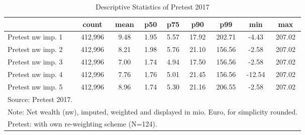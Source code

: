 \begin{table}[htbp]\centering
\def\sym#1{\ifmmode^{#1}\else\(^{#1}\)\fi}
\caption{Descriptive Statistics of Pretest 2017}
\begin{tabular}{l*{1}{cccccccc}}
\hline\hline
                                            &       count&        mean&         p50&         p75&         p90&         p99&         min&         max\\
\hline
Pretest nw imp. 1                           &     412,996&        9.48&        1.95&        5.57&       17.92&      202.71&       -4.43&      207.02\\
Pretest nw imp. 2                           &     412,996&        8.21&        1.98&        5.76&       21.10&      156.56&       -2.58&      207.02\\
Pretest nw imp. 3                           &     412,996&        7.00&        1.74&        4.94&       17.50&      156.56&       -2.58&      207.02\\
Pretest nw imp. 4                           &     412,996&        7.76&        1.76&        5.01&       21.45&      156.56&      -12.54&      207.02\\
Pretest nw imp. 5                           &     412,996&        8.96&        1.74&        5.30&       21.16&      206.55&       -2.58&      207.02\\
\hline\hline
\multicolumn{9}{l}{\footnotesize Source: Pretest 2017.}\\
\multicolumn{9}{l}{\footnotesize Note: Net wealth (nw), imputed, weighted and displayed in mio. Euro, for simplicity rounded.}\\
\multicolumn{9}{l}{\footnotesize Pretest: with own re-weighting scheme (N=124).}\\
\end{tabular}
\end{table}

